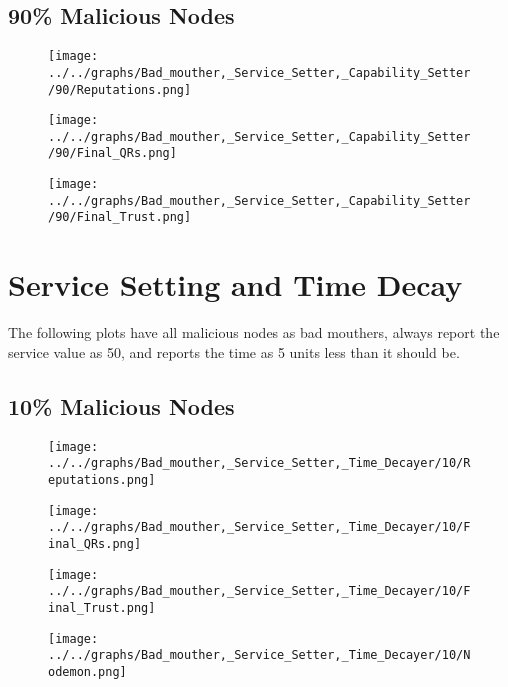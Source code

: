 \begin{minipage}[t]{0.49\columnwidth}
\subsection*{90\% Malicious Nodes}
    \begin{figure}[H]
        \centering
        \texttt{[image: ../../graphs/Bad\_mouther,\_Service\_Setter,\_Capability\_Setter/90/Reputations.png]}
    \end{figure}
    \begin{figure}[H]
        \centering
        \texttt{[image: ../../graphs/Bad\_mouther,\_Service\_Setter,\_Capability\_Setter/90/Final\_QRs.png]}
    \end{figure}
\end{minipage}
\begin{minipage}[t]{0.49\columnwidth}
    \begin{figure}[H]
        \centering
        \texttt{[image: ../../graphs/Bad\_mouther,\_Service\_Setter,\_Capability\_Setter/90/Final\_Trust.png]}
    \end{figure}
\end{minipage}
\newpage

\section*{Service Setting and Time Decay}
The following plots have all malicious nodes as bad mouthers, always
report the service value as 50, and reports the time as 5 units less than
it should be.
\\
\begin{minipage}[t]{0.49\columnwidth}
\subsection*{10\% Malicious Nodes}
    \begin{figure}[H]
        \centering
        \texttt{[image: ../../graphs/Bad\_mouther,\_Service\_Setter,\_Time\_Decayer/10/Reputations.png]}
    \end{figure}
    \begin{figure}[H]
        \centering
        \texttt{[image: ../../graphs/Bad\_mouther,\_Service\_Setter,\_Time\_Decayer/10/Final\_QRs.png]}
    \end{figure}
\end{minipage}
\begin{minipage}[t]{0.49\columnwidth}
    \begin{figure}[H]
        \centering
        \texttt{[image: ../../graphs/Bad\_mouther,\_Service\_Setter,\_Time\_Decayer/10/Final\_Trust.png]}
    \end{figure}
    \begin{figure}[H]
        \centering
        \texttt{[image: ../../graphs/Bad\_mouther,\_Service\_Setter,\_Time\_Decayer/10/Nodemon.png]}
    \end{figure}
\end{minipage}

